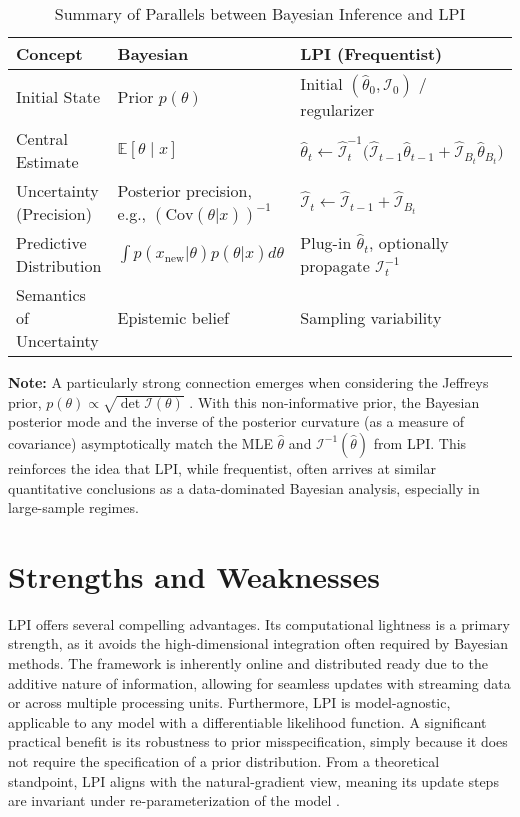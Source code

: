 \documentclass[11pt]{article}
\begin{document}
\begin{table}[h!]
\centering
\begin{tabular}{l m{4.2cm} m{5.8cm}} 
\toprule
Concept & Bayesian & LPI (Frequentist) \\
\midrule
Initial State & Prior $p(\theta)$ & Initial $(\hat\theta_0, \mathcal{I}_0)$ / regularizer \\
Central Estimate & $\mathbb E[\theta\mid x]$ & $\hat\theta_{t} \leftarrow \hat{\mathcal I}_{t}^{-1}\bigl(\hat{\mathcal I}_{t-1}\hat\theta_{t-1} + \hat{\mathcal I}_{B_t}\hat\theta_{B_t}\bigr)$ \\
Uncertainty (Precision) & Posterior precision, e.g., $(\text{Cov}(\theta|x))^{-1}$ & $\hat{\mathcal I}_{t} \leftarrow \hat{\mathcal I}_{t-1} + \hat{\mathcal I}_{B_t}$ \\
Predictive Distribution & $\int p(x_{\text{new}}|\theta)p(\theta|x)d\theta$ & Plug-in $\hat\theta_t$, optionally propagate $\mathcal{I}_t^{-1}$ \\
Semantics of Uncertainty & Epistemic belief & Sampling variability \\
\bottomrule
\end{tabular}
\caption{Summary of Parallels between Bayesian Inference and LPI}
\label{tab:bayes_lpi_parallels}
\end{table}

\textbf{Note:} A particularly strong connection emerges when considering the Jeffreys prior, $p(\theta)\propto\sqrt{\det\mathcal I(\theta)}$ \cite{jeffreys1939theory, robert2007bayesian}. With this non-informative prior, the Bayesian posterior mode and the inverse of the posterior curvature (as a measure of covariance) asymptotically match the MLE $\hat{\theta}$ and $\mathcal{I}^{-1}(\hat{\theta})$ from LPI. This reinforces the idea that LPI, while frequentist, often arrives at similar quantitative conclusions as a data-dominated Bayesian analysis, especially in large-sample regimes.

\section{Strengths and Weaknesses}

LPI offers several compelling advantages. Its computational lightness is a primary strength, as it avoids the high-dimensional integration often required by Bayesian methods. The framework is inherently online and distributed ready due to the additive nature of information, allowing for seamless updates with streaming data or across multiple processing units. Furthermore, LPI is model-agnostic, applicable to any model with a differentiable likelihood function. A significant practical benefit is its robustness to prior misspecification, simply because it does not require the specification of a prior distribution. From a theoretical standpoint, LPI aligns with the natural-gradient view, meaning its update steps are invariant under re-parameterization of the model \cite{amari1998natural}.
\end{document}
